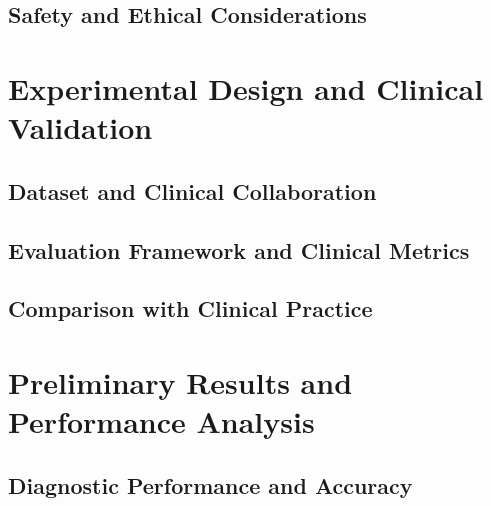 \subsection{Safety and Ethical Considerations}

\section{Experimental Design and Clinical Validation}

\subsection{Dataset and Clinical Collaboration}

\subsection{Evaluation Framework and Clinical Metrics}

\subsection{Comparison with Clinical Practice}

\section{Preliminary Results and Performance Analysis}

\subsection{Diagnostic Performance and Accuracy}

